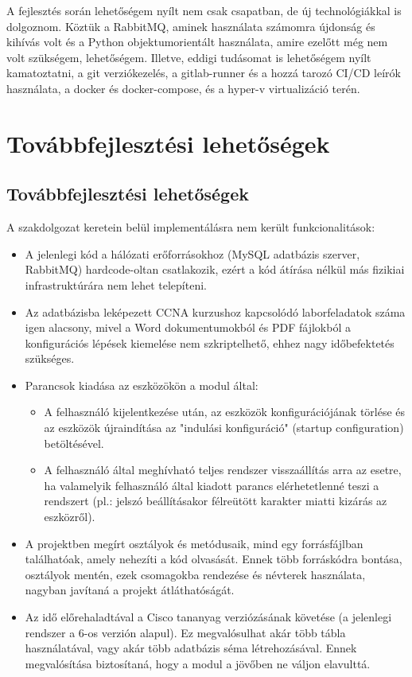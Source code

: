 \documentclass[12pt]{report}
\begin{document}
A fejlesztés során lehetőségem nyílt nem csak csapatban, de új technológiákkal is dolgoznom. Köztük a RabbitMQ, aminek használata számomra újdonság és kihívás volt és a Python objektumorientált használata, amire ezelőtt még nem volt szükségem, lehetőségem. Illetve, eddigi tudásomat is lehetőségem nyílt kamatoztatni, a git verziókezelés, a gitlab-runner és a hozzá tarozó CI/CD leírók használata, a docker és docker-compose, és a hyper-v virtualizáció terén.


\chapter{Továbbfejlesztési lehetőségek}
\section{Továbbfejlesztési lehetőségek}

A szakdolgozat keretein belül implementálásra nem került funkcionalitások:
\begin{itemize}
    \item A jelenlegi kód a hálózati erőforrásokhoz (MySQL adatbázis szerver, RabbitMQ) hardcode-oltan csatlakozik, ezért a kód átírása nélkül más fizikiai infrastruktúrára nem lehet telepíteni.
    \item Az adatbázisba leképezett CCNA kurzushoz kapcsolódó laborfeladatok száma igen alacsony, mivel a Word dokumentumokból és PDF fájlokból a konfigurációs lépések kiemelése nem szkriptelhető, ehhez nagy időbefektetés szükséges.
    \item Parancsok kiadása az eszközökön a modul által:
    \begin{itemize}
        \item A felhasználó kijelentkezése után, az eszközök konfigurációjának törlése és az eszközök újraindítása az "indulási konfiguráció" (startup configuration) betöltésével.
        \item A felhasználó által meghívható teljes rendszer visszaállítás arra az esetre, ha valamelyik felhasználó által kiadott parancs elérhetetlenné teszi a rendszert (pl.: jelszó beállításakor félreütött karakter miatti kizárás az eszközről).
    \end{itemize}
    \item A projektben megírt osztályok és metódusaik, mind egy forrásfájlban találhatóak, amely nehezíti a kód olvasását. Ennek több forráskódra bontása, osztályok mentén, ezek csomagokba rendezése és névterek használata, nagyban javítaná a projekt átláthatóságát.
    \newpage
    \item Az idő előrehaladtával a Cisco tananyag verziózásának követése (a jelenlegi rendszer a 6-os verzión alapul). Ez megvalósulhat akár több tábla használatával, vagy akár több adatbázis séma létrehozásával. Ennek megvalósítása biztosítaná, hogy a modul a jövőben ne váljon elavulttá.
\end{itemize}
\end{document}
